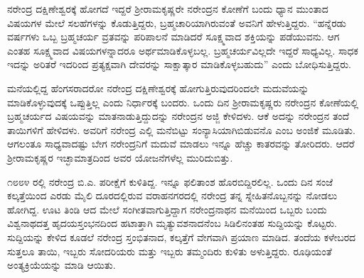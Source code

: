 ನರೇಂದ್ರ ದಕ್ಷಿಣೇಶ್ವರಕ್ಕೆ ಹೋಗದೆ ಇದ್ದರೆ ಶ‍್ರೀರಾಮಕೃಷ್ಣರೇ ನರೇಂದ್ರನ ಕೋಣೆಗೆ ಬಂದು ಧ್ಯಾನ ಮುಂತಾದ ವಿಷಯಗಳ ಮೇಲೆ ಸಲಹೆಗಳನ್ನು ಕೊಡುತ್ತಿದ್ದರು, ಬ್ರಹ್ಮಚಾರಿಯಾಗಿರುವಂತೆ ಅವನಿಗೆ ಹೇಳುತ್ತಿದ್ದರು. “ಹನ್ನೆರಡು ವರ್ಷಗಳು ಒಬ್ಬ ಬ್ರಹ್ಮಚರ್ಯ ವ್ರತವನ್ನು ಪರಿಪಾಲನೆ ಮಾಡಿದರೆ ಸೂಕ್ಷ್ಮವಾದ ಶಕ್ತಿಯನ್ನು ಪಡೆಯುವನು. ಆಗ ಎಂತಹ ಸೂಕ್ಷ್ಮವಾದ ವಿಷಯಗಳನ್ನಾದರೂ ಅರ್ಥಮಾಡಿಕೊಳ್ಳಬಲ್ಲ. ಬ್ರಹ್ಮಚರ್ಯವಿಲ್ಲದೇ ಇದ್ದರೆ ಸಾಧ್ಯವಿಲ್ಲ. ಸಾಧಕ ಇದನ್ನು ಅರಿತರೆ ಇದರಿಂದ ಪ್ರತ್ಯಕ್ಷವಾಗಿ ದೇವರನ್ನು ಸಾಕ್ಷಾತ್ಕಾರ ಮಾಡಿಕೊಳ್ಳಬಹುದು” ಎಂದು ಬೋಧಿಸುತ್ತಿದ್ದರು.

ಮನೆಯಲ್ಲಿದ್ದ ಹೆಂಗಸರಾದರೋ ನರೇಂದ್ರ ದಕ್ಷಿಣೇಶ್ವರಕ್ಕೆ ಹೋಗುತ್ತಿರುವುದರಿಂದಲೇ ಮದುವೆಯನ್ನು ಮಾಡಿಕೊಳ್ಳುವುದಕ್ಕೆ ಒಪ್ಪುತ್ತಿಲ್ಲ ಎಂದು ನಿರ್ಧಾರಕ್ಕೆ ಬಂದರು. ಒಂದು ದಿನ ಶ‍್ರೀರಾಮಕೃಷ್ಣರು ನರೇಂದ್ರನ ಕೋಣೆಯಲ್ಲಿ ಬ್ರಹ್ಮಚರ್ಯದ ವಿಷಯವನ್ನು ಮಾತನಾಡುತ್ತಿದ್ದುದನ್ನು ನರೇಂದ್ರನ ಅಜ್ಜಿ ಕೇಳಿದಳು. ಆಕೆ ಅದನ್ನು ನರೇಂದ್ರನ ತಂದೆ ತಾಯಿಗಳಿಗೆ ಹೇಳಿದಳು. ಅವರಿಗೆ ನರೇಂದ್ರ ಎಲ್ಲಿ ಮನೆಬಿಟ್ಟು ಸಂನ್ಯಾಸಿಯಾಗಿಬಿಡುವನೊ ಎಂಬ ಅಂಜಿಕೆ ಮೂಡಿತು. ಆಗಲಂತೂ ಸಾಧ್ಯವಾದಷ್ಟು ಬೇಗ ನರೇಂದ್ರನಿಗೆ ಮದುವೆ ಮಾಡಲು ಇನ್ನೂ ಹೆಚ್ಚು ಕಾತರವನ್ನು ತೋರಿದರು. ಆದರೆ ಶ‍್ರೀರಾಮಕೃಷ್ಣರ ಇಚ್ಛಾಮಾತ್ರದಿಂದ ಅವರ ಯೋಜನೆಗಳೆಲ್ಲ ಮುರಿದುಬಿತ್ತು.

೧೮೮೪ ರಲ್ಲಿ ನರೇಂದ್ರ ಬಿ.ಎ. ಪರೀಕ್ಷೆಗೆ ಕುಳಿತಿದ್ದ. ಇನ್ನೂ ಫಲಿತಾಂಶ ಹೊರಬಿದ್ದಿರಲಿಲ್ಲ. ಒಂದು ದಿನ ಸಂಜೆ ಕಲ್ಕತ್ತೆಯಿಂದ ಎರಡು ಮೈಲಿ ದೂರದಲ್ಲಿರುವ ವರಾಹನಗರದಲ್ಲಿ ನರೇಂದ್ರ ತನ್ನ ಸ್ನೇಹಿತನೊಬ್ಬನನ್ನು ನೋಡಲು ಹೋಗಿದ್ದ. ಊಟ ತಿಂಡಿ ಆದ ಮೇಲೆ ಸಂಗೀತವಾಗುತ್ತಿದ್ದಾಗ ನರೇಂದ್ರನಾಥನ ಮನೆಯಿಂದ ಒಬ್ಬರು ಬಂದು ವಿಶ್ವನಾಥದತ್ತ ಹೃದಯಸ್ತಂಭನದಿಂದ ಹಟಾತ್ತಾಗಿ ಮೃತ್ಯುವಶನಾದನೆಂಬ ಸಿಡಿಲಿನಂತಹ ಸುದ್ದಿಯನ್ನು ಕೊಟ್ಟರು. ಸುದ್ದಿಯನ್ನು ಕೇಳಿದ ಕೂಡಲೆ ನರೇಂದ್ರ ಸ್ತಂಭಿತನಾದ, ಕಲ್ಕತ್ತೆಗೆ ವೇಗವಾಗಿ ಪ್ರಯಾಣ ಮಾಡಿದ. ತಂದೆಯ ಕಳೇಬರದ ಸುತ್ತಲೂ ತಾಯಿ, ಇಬ್ಬರು ಸೋದರಿಯರು ಮತ್ತು ಇಬ್ಬರು ತಮ್ಮಂದಿರು ಕುಳಿತು ಅಳುತ್ತಿದ್ದರು. ರೂಢಿಯಂತೆ ಅಂತ್ಯಕ್ರಿಯೆಯನ್ನು ಮಾಡಿ ಆಯಿತು.

